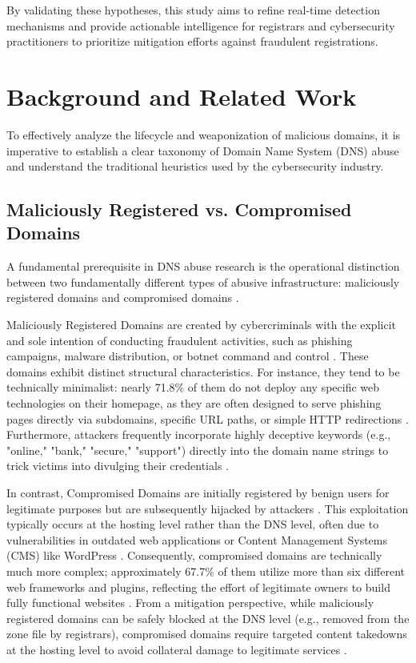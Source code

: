 \documentclass[final, 9pt, twocolumn]{saucis}
\begin{document}
By validating these hypotheses, this study aims to refine real-time detection mechanisms and provide actionable intelligence for registrars and cybersecurity practitioners to prioritize mitigation efforts against fraudulent registrations.

\section{Background and Related Work}

To effectively analyze the lifecycle and weaponization of malicious domains, it is imperative to establish a clear taxonomy of Domain Name System (DNS) abuse and understand the traditional heuristics used by the cybersecurity industry.

\subsection{Maliciously Registered vs. Compromised Domains}
A fundamental prerequisite in DNS abuse research is the operational distinction between two fundamentally different types of abusive infrastructure: maliciously registered domains and compromised domains \cite{comar_classification}. 

Maliciously Registered Domains are created by cybercriminals with the explicit and sole intention of conducting fraudulent activities, such as phishing campaigns, malware distribution, or botnet command and control \cite{comar_classification, apwg_trends}. These domains exhibit distinct structural characteristics. For instance, they tend to be technically minimalist: nearly 71.8\% of them do not deploy any specific web technologies on their homepage, as they are often designed to serve phishing pages directly via subdomains, specific URL paths, or simple HTTP redirections \cite{comar_technologies}. Furthermore, attackers frequently incorporate highly deceptive keywords (e.g., "online," "bank," "secure," "support") directly into the domain name strings to trick victims into divulging their credentials \cite{comar_lexical_phishing}.

In contrast, Compromised Domains are initially registered by benign users for legitimate purposes but are subsequently hijacked by attackers \cite{comar_classification}. This exploitation typically occurs at the hosting level rather than the DNS level, often due to vulnerabilities in outdated web applications or Content Management Systems (CMS) like WordPress \cite{comar_classification, comar_aging}. Consequently, compromised domains are technically much more complex; approximately 67.7\% of them utilize more than six different web frameworks and plugins, reflecting the effort of legitimate owners to build fully functional websites \cite{comar_technologies}. From a mitigation perspective, while maliciously registered domains can be safely blocked at the DNS level (e.g., removed from the zone file by registrars), compromised domains require targeted content takedowns at the hosting level to avoid collateral damage to legitimate services \cite{dns_abuse_framework, comar_mitigation}.
\end{document}
